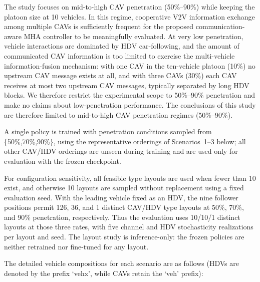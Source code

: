 \documentclass{ieeeaccess}
\begin{document}
The study focuses on mid-to-high CAV penetration (50\%--90\%) while keeping the platoon size at 10 vehicles. In this regime, cooperative V2V information exchange among multiple CAVs is sufficiently frequent for the proposed communication-aware MHA controller to be meaningfully evaluated. At very low penetration, vehicle interactions are dominated by HDV car-following, and the amount of communicated CAV information is too limited to exercise the multi-vehicle information-fusion mechanism: with one CAV in the ten-vehicle platoon (10\%) no upstream CAV message exists at all, and with three CAVs (30\%) each CAV receives at most two upstream CAV messages, typically separated by long HDV blocks. We therefore restrict the experimental scope to 50\%--90\% penetration and make no claims about low-penetration performance. The conclusions of this study are therefore limited to mid-to-high CAV penetration regimes (50\%--90\%).

A single policy is trained with penetration conditions sampled from \{50\%,70\%,90\%\}, using the representative orderings of Scenarios~1--3 below; all other CAV/HDV orderings are unseen during training and are used only for evaluation with the frozen checkpoint.

For configuration sensitivity, all feasible type layouts are used when fewer than 10 exist, and otherwise 10 layouts are sampled without replacement using a fixed evaluation seed. With the leading vehicle fixed as an HDV, the nine follower positions permit 126, 36, and 1 distinct CAV/HDV type layouts at 50\%, 70\%, and 90\% penetration, respectively. Thus the evaluation uses 10/10/1 distinct layouts at those three rates, with five channel and HDV stochasticity realizations per layout and seed. The layout study is inference-only: the frozen policies are neither retrained nor fine-tuned for any layout. %





The detailed vehicle compositions for each scenario are as follows (HDVs are denoted by the prefix `vehx', while CAVs retain the `veh' prefix):
\end{document}
